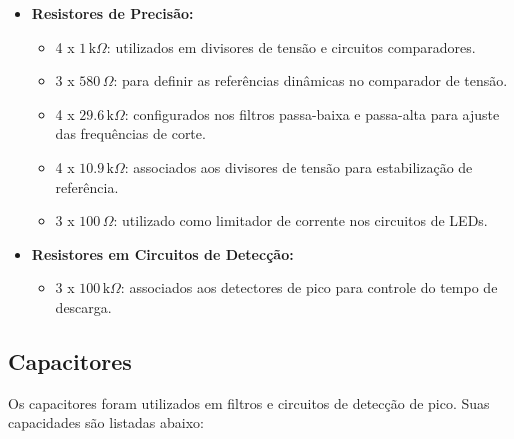 \documentclass[a4paper, 12pt]{article}
\begin{document}
\begin{itemize}
    \item \textbf{Resistores de Precisão:}
    \begin{itemize}
        \item 4 x $1 \, \text{k}\Omega$: utilizados em divisores de tensão e circuitos comparadores.
        \item 3 x $580 \, \Omega$: para definir as referências dinâmicas no comparador de tensão.
        \item 4 x $29.6 \, \text{k}\Omega$: configurados nos filtros passa-baixa e passa-alta para ajuste das frequências de corte.
        \item 4 x $10.9 \, \text{k}\Omega$: associados aos divisores de tensão para estabilização de referência.
        \item 3 x $100 \, \Omega$: utilizado como limitador de corrente nos circuitos de LEDs.
    \end{itemize}

    \item \textbf{Resistores em Circuitos de Detecção:}
    \begin{itemize}
        \item 3 x $100 \, \text{k}\Omega$: associados aos detectores de pico para controle do tempo de descarga.
    \end{itemize}
\end{itemize}

\subsection{Capacitores}

Os capacitores foram utilizados em filtros e circuitos de detecção de pico. Suas capacidades são listadas abaixo:
\end{document}
